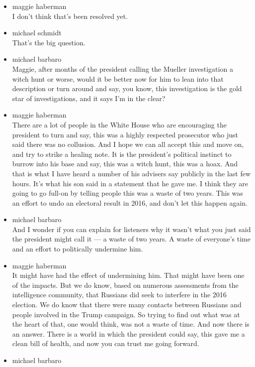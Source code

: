 \begin{itemize}
\item
  maggie haberman\\
  I don't think that's been resolved yet.
\item
  michael schmidt\\
  That's the big question.
\item
  michael barbaro\\
  Maggie, after months of the president calling the Mueller
  investigation a witch hunt or worse, would it be better now for him to
  lean into that description or turn around and say, you know, this
  investigation is the gold star of investigations, and it says I'm in
  the clear?
\item
  maggie haberman\\
  There are a lot of people in the White House who are encouraging the
  president to turn and say, this was a highly respected prosecutor who
  just said there was no collusion. And I hope we can all accept this
  and move on, and try to strike a healing note. It is the president's
  political instinct to burrow into his base and say, this was a witch
  hunt, this was a hoax. And that is what I have heard a number of his
  advisers say publicly in the last few hours. It's what his son said in
  a statement that he gave me. I think they are going to go full-on by
  telling people this was a waste of two years. This was an effort to
  undo an electoral result in 2016, and don't let this happen again.
\item
  michael barbaro\\
  And I wonder if you can explain for listeners why it wasn't what you
  just said the president might call it --- a waste of two years. A
  waste of everyone's time and an effort to politically undermine him.
\item
  maggie haberman\\
  It might have had the effect of undermining him. That might have been
  one of the impacts. But we do know, based on numerous assessments from
  the intelligence community, that Russians did seek to interfere in the
  2016 election. We do know that there were many contacts between
  Russians and people involved in the Trump campaign. So trying to find
  out what was at the heart of that, one would think, was not a waste of
  time. And now there is an answer. There is a world in which the
  president could say, this gave me a clean bill of health, and now you
  can trust me going forward.
\item
  michael barbaro\\

\end{itemize}
